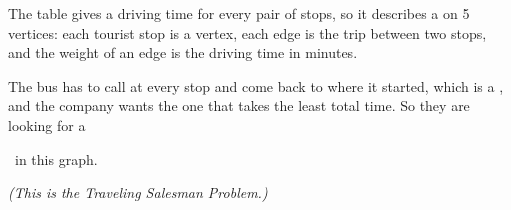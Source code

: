 \begin{sol}
\nohw
The table gives a driving time for every pair of stops, so it describes a  on 5 vertices: each tourist stop is a vertex, each edge is the trip between two stops, and
the weight of an edge is the driving time in minutes.

The bus has to call at every stop and come back to where it started, which is a
, and the company wants the one that takes the least total time. So they
are looking for a

\begin{center}
 \ in this graph.
\end{center}

\vspace{0.3em}
\emph{(This is the Traveling Salesman Problem.)}
\end{sol}



